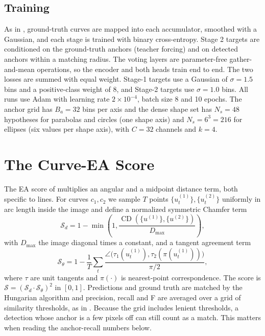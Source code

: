 \documentclass[11pt]{article}
\begin{document}
\subsection{Training}
As in \citet{zhao2021deep}, ground-truth curves are mapped into each accumulator, smoothed with a Gaussian, and each stage is trained with binary cross-entropy. Stage 2 targets are conditioned on the ground-truth anchors (teacher forcing) and on detected anchors within a matching radius. The voting layers are parameter-free gather-and-mean operations, so the encoder and both heads train end to end. The two losses are summed with equal weight. Stage-1 targets use a Gaussian of $\sigma=1.5$ bins and a positive-class weight of 8, and Stage-2 targets use $\sigma=1.0$ bins. All runs use Adam with learning rate $2\times10^{-4}$, batch size 8 and 10 epochs. The anchor grid has $B_a=32$ bins per axis and the dense shape set has $N_s=48$ hypotheses for parabolas and circles (one shape axis) and $N_s=6^3=216$ for ellipses (six values per shape axis), with $C=32$ channels and $k=4$.

\section{The Curve-EA Score}
\label{sec:metric}
The EA score of \citet{zhao2021deep} multiplies an angular and a midpoint distance term, both specific to lines. For curves $c_1,c_2$ we sample $T$ points $\{u^{(1)}_t\},\{u^{(2)}_t\}$ uniformly in arc length inside the image and define a normalized symmetric Chamfer term
\begin{equation}
\mathcal{S}_d=1-\min\!\left(1,\frac{\operatorname{CD}(\{u^{(1)}\},\{u^{(2)}\})}{D_{\max}}\right),
\end{equation}
with $D_{\max}$ the image diagonal times a constant, and a tangent agreement term
\begin{equation}
\mathcal{S}_\theta=1-\frac{1}{T}\sum_t\frac{\angle\big(\tau_1(u^{(1)}_t),\tau_2(\pi(u^{(1)}_t))\big)}{\pi/2},
\end{equation}
where $\tau$ are unit tangents and $\pi(\cdot)$ is nearest-point correspondence. The score is $\mathcal{S}=(\mathcal{S}_d\cdot\mathcal{S}_\theta)^2$ in $[0,1]$. Predictions and ground truth are matched by the Hungarian algorithm and precision, recall and F are averaged over a grid of similarity thresholds, as in \citet{zhao2021deep}. Because the grid includes lenient thresholds, a detection whose anchor is a few pixels off can still count as a match. This matters when reading the anchor-recall numbers below.
\end{document}
